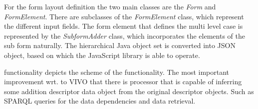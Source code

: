 
For the form layout definition the two main classes are the \textit{Form} and \textit{FormElement}. There are subclasses of the \textit{FormElement} class, which represent the different input fields. The form element that defines the multi level case is represented by the \textit{SubformAdder} class, which incorporates the elements of the sub form naturally. The hierarchical Java object set is converted into JSON object, based on which the JavaScript library is able to operate. 

 functionality depicts the scheme of the functionality. The most important improvement wrt. to VIVO that there is processor that is capable of inferring some addition descriptor data object from the original descriptor objects. Such as SPARQL queries for the data dependencies and data retrieval.  

